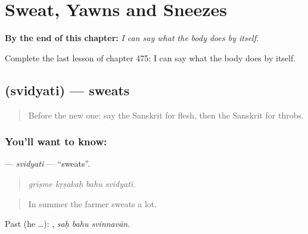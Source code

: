
\chapter{Sweat, Yawns and Sneezes}
\label{ch:sa-sweat-yawns-and-sneezes}

\begin{chapteropening}
\textbf{By the end of this chapter:} \emph{I can say what the body does by itself.}

Complete the last lesson of chapter 475: I can say what the body does by itself.
\end{chapteropening}

\section[\texorpdfstring{\sk{स्विद्यति} (svidyati)}{स्विद्यति (svidyati)}]{ (svidyati) — sweats}

\label{lesson:SA-C475-svidyati}



\begin{quote}
Before the new one: say the Sanskrit for flesh, then the Sanskrit for throbs.
\end{quote}

\subsection*{You'll want to know: }
\textbf{} — \emph{svidyati} — \textquotedblleft{}sweats\textquotedblright{}.

\begin{quote}
   
\end{quote}

\begin{quote}
\emph{grīṣme kṛṣakaḥ bahu svidyati.}
\end{quote}

\begin{quote}
In summer the farmer sweats a lot.
\end{quote}

Past (he …):   , \emph{saḥ bahu svinnavān}.

